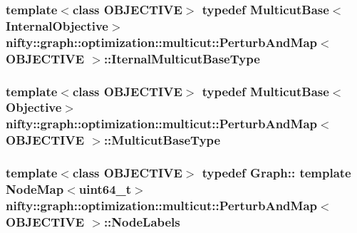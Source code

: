 \subsubsection[{Iternal\+Multicut\+Base\+Type}]{\setlength{\rightskip}{0pt plus 5cm}template$<$class O\+B\+J\+E\+C\+T\+I\+V\+E$>$ typedef {\bf Multicut\+Base}$<${\bf Internal\+Objective}$>$ {\bf nifty\+::graph\+::optimization\+::multicut\+::\+Perturb\+And\+Map}$<$ O\+B\+J\+E\+C\+T\+I\+V\+E $>$\+::{\bf Iternal\+Multicut\+Base\+Type}}\label{classnifty_1_1graph_1_1optimization_1_1multicut_1_1PerturbAndMap_a7fc461eff81908dda41de81d703bc895}
\hypertarget{classnifty_1_1graph_1_1optimization_1_1multicut_1_1PerturbAndMap_a46831cc073623314c4d077f4e51bbeb5}{}
\subsubsection[{Multicut\+Base\+Type}]{\setlength{\rightskip}{0pt plus 5cm}template$<$class O\+B\+J\+E\+C\+T\+I\+V\+E$>$ typedef {\bf Multicut\+Base}$<${\bf Objective}$>$ {\bf nifty\+::graph\+::optimization\+::multicut\+::\+Perturb\+And\+Map}$<$ O\+B\+J\+E\+C\+T\+I\+V\+E $>$\+::{\bf Multicut\+Base\+Type}}\label{classnifty_1_1graph_1_1optimization_1_1multicut_1_1PerturbAndMap_a46831cc073623314c4d077f4e51bbeb5}
\hypertarget{classnifty_1_1graph_1_1optimization_1_1multicut_1_1PerturbAndMap_a693ef4c90566732057ce860c6215d100}{}
\subsubsection[{Node\+Labels}]{\setlength{\rightskip}{0pt plus 5cm}template$<$class O\+B\+J\+E\+C\+T\+I\+V\+E$>$ typedef Graph\+:: template Node\+Map$<$uint64\+\_\+t$>$ {\bf nifty\+::graph\+::optimization\+::multicut\+::\+Perturb\+And\+Map}$<$ O\+B\+J\+E\+C\+T\+I\+V\+E $>$\+::{\bf Node\+Labels}}\label{classnifty_1_1graph_1_1optimization_1_1multicut_1_1PerturbAndMap_a693ef4c90566732057ce860c6215d100}
\hypertarget{classnifty_1_1graph_1_1optimization_1_1multicut_1_1PerturbAndMap_a2048cdfa7924f3638cbf678021514bdd}{}
